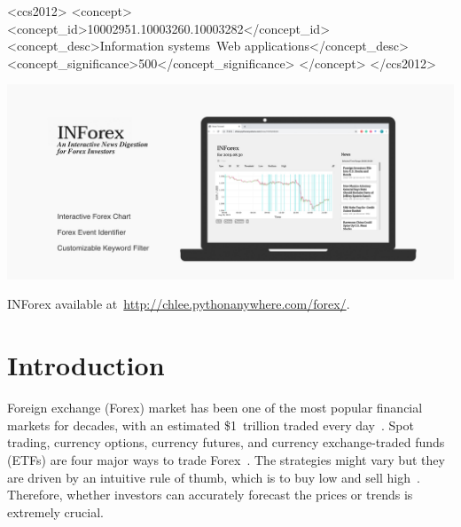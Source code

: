 \documentclass[sigconf]{acmart}
\begin{document}
\begin{CCSXML}
<ccs2012>
   <concept>
       <concept_id>10002951.10003260.10003282</concept_id>
       <concept_desc>Information systems~Web applications</concept_desc>
       <concept_significance>500</concept_significance>
       </concept>
 </ccs2012>
\end{CCSXML}




\begin{teaserfigure}
  \includegraphics[width=\textwidth]{teaser.pdf}
  \caption{INForex available at~\url{http://chlee.pythonanywhere.com/forex/}.}
  \Description{}
  \label{fig:teaser}
\end{teaserfigure}


\maketitle

\section{Introduction}
Foreign exchange (Forex) market has been one of the most popular financial markets for decades, with an estimated \$1\ trillion traded every day~\cite{YAO200079}.
Spot trading, currency options, currency futures, and currency exchange-traded funds (ETFs) are four major ways to trade Forex~\cite{TradeForex}.
The strategies might vary but they are driven by an intuitive rule of thumb, which is to buy low and sell high~\cite{KOOLEN2014144,Zervos11}.
Therefore, whether investors can accurately forecast the prices or trends is extremely crucial. 
\end{document}

